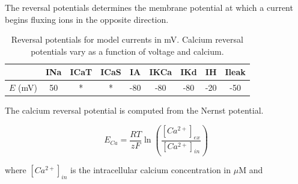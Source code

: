 
The reversal potentials determines the membrane potential at which a current begins fluxing ions in the opposite direction.

\begin{table}[h]
	\myfloatalign
	\begin{tabularx}{\textwidth}{ccccccccc} \toprule
		\tableheadline{Current} & \acs{INa} & \acs{ICaT} & \acs{ICaS} & \acs{IA} & \ac{IKCa} & \ac{IKd} & \ac{IH} & \ac{Ileak} \\ \midrule
		$E$ (mV) & 50 & * & * & -80 & -80 & -80 & -20 & -50 \\ \bottomrule
	\end{tabularx}
	\caption[Reversal potentials for model currents]{Reversal potentials for model currents in mV. Calcium reversal potentials vary as a function of voltage and calcium.}  
	\label{tab:reversalpotentials}
\end{table}

\FloatBarrier

The calcium reversal potential is computed from the Nernst potential\autocite{FreschiProctolinactivatesslow1989, GoldmanGlobalStructureRobustness2001}.

\begin{equation}
	E_{Ca} = \frac{RT}{zF} \ln \left( \frac{\left[ Ca^{2+} \right]_{ex}}{\left[ Ca^{2+} \right]_{in}} \right)
\end{equation}

where $\left[ Ca^{2+} \right]_{in}$ is the intracellular calcium concentration in $\mu\mathrm{M}$ and 

